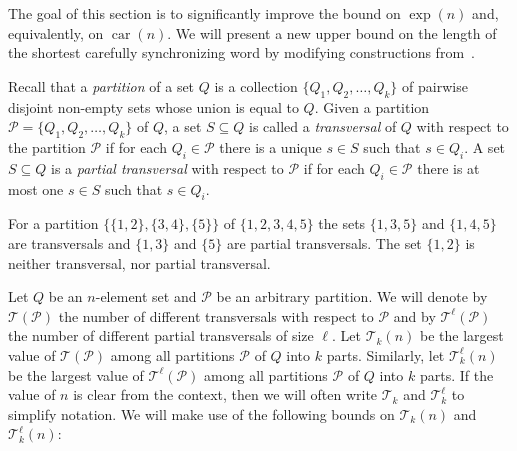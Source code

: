 \documentclass[a4paper,USenglish]{lipics}
\DeclareMathOperator{\car}{car}
\theoremstyle{definition}
\begin{document}
The goal of this section is to significantly improve the bound on $\exp(n)$ and, equivalently, on $\car(n)$. 
We will present a new upper bound on the length of the shortest carefully synchronizing word by modifying constructions from~\cite{Ivan2009}. 


Recall that a \emph{partition} of a set $Q$ is a collection $\{Q_1, Q_2, \ldots, Q_k\}$ of pairwise disjoint non-empty sets whose union is equal to $Q$. Given a partition $\mathscr{P} =\{Q_1, Q_2, \ldots, Q_k\}$ of $Q$, a set $S \subseteq Q$ is called a {\it transversal} of $Q$ with respect to the partition $\mathscr{P}$ if for each $Q_i \in \mathscr{P}$ there is a unique $s \in S$ such that $s \in Q_i$.
A set $S \subseteq Q$ is a {\it partial transversal} with respect to $\mathscr{P}$ if for each $Q_i \in \mathscr{P}$ there is at most one $s \in S$ such that $s \in Q_i$.

\begin{example}
For a partition $\{\{1,2\}, \{3,4\}, \{5\} \}$ of $\{1,2,3,4,5\}$ the sets $\{1,3,5\}$ and $\{1,4,5\}$ are transversals and $\{1,3\}$ and $\{5\}$ are partial transversals. The set $\{1,2\}$ is neither transversal, nor partial transversal.
\end{example}
Let $Q$ be an $n$-element set and $\mathscr{P}$ be an arbitrary partition. We will denote by $\mathscr{T}(\mathscr{P})$ the number of different transversals with respect to $\mathscr{P}$ and by $\mathscr{T}^\ell (\mathscr{P})$ the number of different partial transversals of size $\ell$.
Let $\mathscr{T}_k(n)$ be the largest value of $\mathscr{T}(\mathscr{P})$ among all partitions $\mathscr{P}$ of $Q$ into $k$ parts. Similarly, let $\mathscr{T}^{\ell}_k(n)$ be the largest value of $\mathscr{T}^\ell(\mathscr{P})$ among all partitions $\mathscr{P}$ of $Q$ into $k$ parts. If the value of $n$ is clear from the context, then we will often write $\mathscr{T}_k$ and $\mathscr{T}^{\ell}_k$ to simplify notation.
We will make use of the following bounds on $\mathscr{T}_k(n)$ and $\mathscr{T}^{\ell}_k(n)$:
\end{document}

